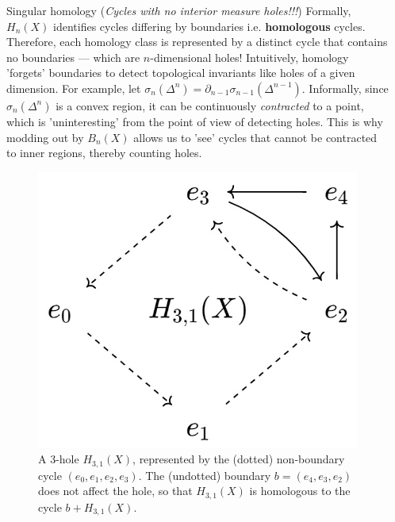\documentclass[final]{beamer}
\newlength{\sepwidth}
\newlength{\colwidth}
\newcommand{\separatorcolumn}{\begin{column}{\sepwidth}\end{column}}
\theoremstyle{remark}
\begin{document}
\begin{frame}[t]
\begin{columns}[t]
\begin{column}{\colwidth}
\begin{block}{Singular homology (\emph{Cycles with no interior measure holes!!!})}
Formally, $H_n(X)$ identifies cycles differing by boundaries i.e. \textbf{homologous} cycles. Therefore, each homology class is represented by a distinct cycle that contains no boundaries --- which are $n$-dimensional holes! Intuitively, homology 'forgets' boundaries to detect topological invariants like holes of a given dimension. For example, let $\sigma_n(\Delta^n) = \partial_{n-1} \sigma_{n-1}(\Delta^{n-1})$. Informally, since $\sigma_n(\Delta^n)$ is a convex region, it can be continuously \emph{contracted} to a point, which is 'uninteresting' from the point of view of detecting holes. This is why modding out by $B_n(X)$ allows us to 'see' cycles that cannot be contracted to inner regions, thereby counting holes.

\begin{figure}[H]
\begin{center}
\includegraphics[width=0.3\colwidth]{homology_class}
\end{center}
\caption{A $3$-hole $H_{3, 1}(X)$, represented by the (dotted) non-boundary cycle $(e_0, e_1, e_2, e_3)$. The (undotted) boundary $b=(e_4, e_3, e_2)$ does not affect the hole, so that $H_{3, 1}(X)$ is homologous to the cycle $b + H_{3, 1}(X)$.}
\end{figure}

\end{block}

\end{column}

\separatorcolumn


\end{columns}
\end{frame}
\end{document}
